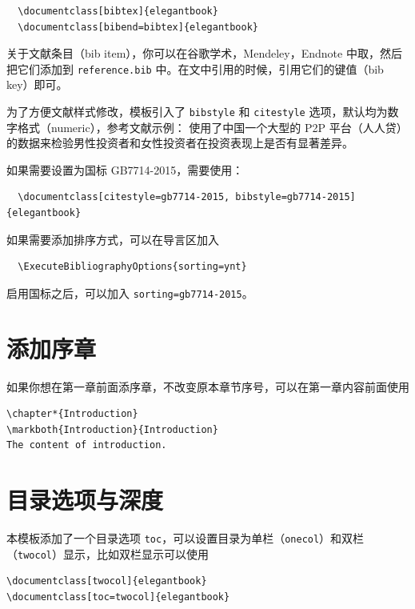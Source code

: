 \documentclass[lang=cn,10pt]{elegantbook}
\begin{document}
\begin{lstlisting}
  \documentclass[bibtex]{elegantbook}
  \documentclass[bibend=bibtex]{elegantbook}
\end{lstlisting}

关于文献条目（bib item），你可以在谷歌学术，Mendeley，Endnote 中取，然后把它们添加到 \lstinline{reference.bib} 中。在文中引用的时候，引用它们的键值（bib key）即可。

为了方便文献样式修改，模板引入了 \lstinline{bibstyle} 和 \lstinline{citestyle} 选项，默认均为数字格式（numeric），参考文献示例：\cite{cn1,en2,en3} 使用了中国一个大型的 P2P 平台（人人贷）的数据来检验男性投资者和女性投资者在投资表现上是否有显著差异。

如果需要设置为国标 GB7714-2015，需要使用：
\begin{lstlisting}
  \documentclass[citestyle=gb7714-2015, bibstyle=gb7714-2015]{elegantbook} 
\end{lstlisting}

如果需要添加排序方式，可以在导言区加入
\begin{lstlisting}
  \ExecuteBibliographyOptions{sorting=ynt}
\end{lstlisting}

启用国标之后，可以加入 \lstinline{sorting=gb7714-2015}。



\section{添加序章}

如果你想在第一章前面添序章，不改变原本章节序号，可以在第一章内容前面使用 
\begin{lstlisting}
\chapter*{Introduction}
\markboth{Introduction}{Introduction}
The content of introduction.
\end{lstlisting}



\section{目录选项与深度}
本模板添加了一个目录选项 \lstinline{toc}，可以设置目录为单栏（\lstinline{onecol}）和双栏（\lstinline{twocol}）显示，比如双栏显示可以使用
\begin{lstlisting}
\documentclass[twocol]{elegantbook}
\documentclass[toc=twocol]{elegantbook}
\end{lstlisting}
\end{document}
